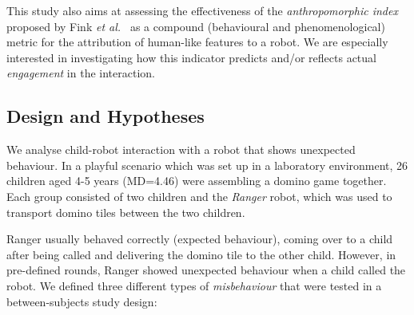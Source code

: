 \documentclass{sig-alternate}
\newcommand{\etal}{{\textit{et al.~}}}
\begin{document}
This study also aims at assessing the effectiveness of the \emph{anthropomorphic
index} proposed by Fink \etal\cite{fink2014dynamics} as a compound (behavioural
and phenomenological) metric for the attribution of human-like features to
a robot. We are especially interested in investigating how this indicator predicts
and/or reflects actual \emph{engagement} in the interaction.

\subsection{Design and Hypotheses}

We analyse child-robot interaction with a robot that shows unexpected behaviour.
In a playful scenario which was set up in a laboratory environment, 26 children
aged 4-5 years (MD=4.46) were assembling a domino game together. Each group
consisted of two children and the \emph{Ranger} robot, which was used to
transport domino tiles between the two children.

Ranger usually behaved correctly (expected behaviour), coming over to a child
after being called and delivering the domino tile to the other child. However,
in pre-defined rounds, Ranger showed unexpected behaviour when a child called the
robot. We defined three different types of \textit{misbehaviour} that were tested
in a between-subjects study design:
\end{document}
